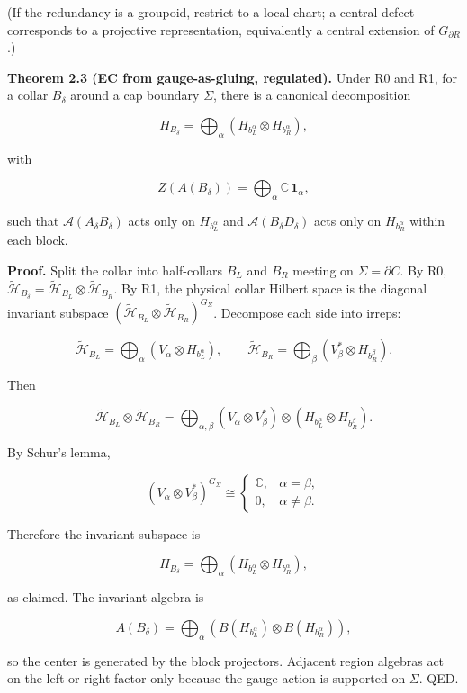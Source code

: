 \documentclass[
]{article}
\begin{document}
(If the redundancy is a groupoid, restrict to a local chart; a central
defect corresponds to a projective representation, equivalently a
central extension of \(G_{\partial R}\).)

\textbf{Theorem 2.3 (EC from gauge-as-gluing, regulated).} Under R0 and
R1, for a collar \(B_\delta\) around a cap boundary \(\Sigma\), there is
a canonical decomposition

\[
H_{B_\delta} = \bigoplus_{\alpha}
(H_{b_L^{\alpha}} \otimes H_{b_R^{\alpha}}),
\]

with

\[
Z(A(B_\delta)) = \bigoplus_\alpha \mathbb C\,\mathbf 1_\alpha,
\]

such that \(\mathcal{A}(A_\delta B_\delta)\) acts only on
\(H_{b_L^\alpha}\) and \(\mathcal{A}(B_\delta D_\delta)\) acts only on
\(H_{b_R^\alpha}\) within each block.

\textbf{Proof.} Split the collar into half-collars \(B_L\) and \(B_R\)
meeting on \(\Sigma = \partial C\). By R0,
\(\tilde{\mathcal H}_{B_\delta} =
\tilde{\mathcal H}_{B_L} \otimes \tilde{\mathcal H}_{B_R}\). By R1, the
physical collar Hilbert space is the diagonal invariant subspace
\((\tilde{\mathcal H}_{B_L} \otimes \tilde{\mathcal H}_{B_R})^{G_\Sigma}\).
Decompose each side into irreps:

\[
\tilde{\mathcal H}_{B_L} = \bigoplus_\alpha (V_\alpha \otimes H_{b_L^\alpha}),\qquad
\tilde{\mathcal H}_{B_R} = \bigoplus_\beta (V_\beta^* \otimes H_{b_R^\beta}).
\]

Then

\[
\tilde{\mathcal H}_{B_L} \otimes \tilde{\mathcal H}_{B_R}
= \bigoplus_{\alpha,\beta}
(V_\alpha \otimes V_\beta^*) \otimes
(H_{b_L^\alpha} \otimes H_{b_R^\beta}).
\]

By Schur's lemma,

\[
(V_\alpha \otimes V_\beta^*)^{G_\Sigma}
\cong
\begin{cases}
\mathbb C, & \alpha=\beta,\\
0, & \alpha\ne\beta.
\end{cases}
\]

Therefore the invariant subspace is

\[
H_{B_\delta} = \bigoplus_\alpha (H_{b_L^\alpha} \otimes H_{b_R^\alpha}),
\]

as claimed. The invariant algebra is

\[
A(B_\delta) = \bigoplus_\alpha
(B(H_{b_L^\alpha}) \otimes B(H_{b_R^\alpha})),
\]

so the center is generated by the block projectors. Adjacent region
algebras act on the left or right factor only because the gauge action
is supported on \(\Sigma\). QED.
\end{document}
